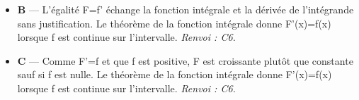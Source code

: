 \begin{itemize}
\begin{itemize}
    \item \textbf{B} — L'égalité F=f' échange la fonction intégrale et la dérivée de l'intégrande sans justification. Le théorème de la fonction intégrale donne F'(x)=f(x) lorsque f est continue sur l'intervalle. \emph{Renvoi : C6.}
    \item \textbf{C} — Comme F'=f et que f est positive, F est croissante plutôt que constante sauf si f est nulle. Le théorème de la fonction intégrale donne F'(x)=f(x) lorsque f est continue sur l'intervalle. \emph{Renvoi : C6.}
  \end{itemize}
\end{itemize}
\fi
